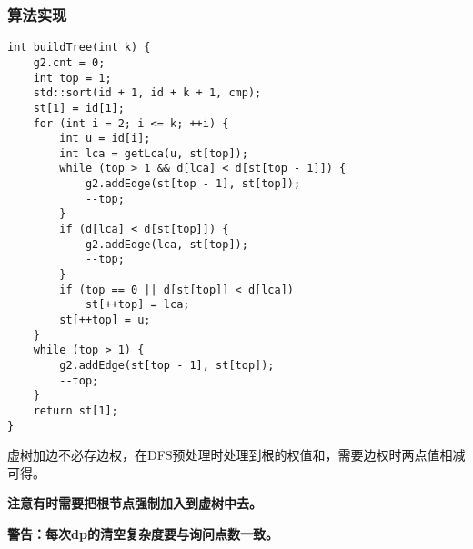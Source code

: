 \subsubsection{算法实现}

\begin{lstlisting}
int buildTree(int k) {
    g2.cnt = 0;
    int top = 1;
    std::sort(id + 1, id + k + 1, cmp);
    st[1] = id[1];
    for (int i = 2; i <= k; ++i) {
        int u = id[i];
        int lca = getLca(u, st[top]);
        while (top > 1 && d[lca] < d[st[top - 1]]) {
            g2.addEdge(st[top - 1], st[top]);
            --top;
        }
        if (d[lca] < d[st[top]]) {
            g2.addEdge(lca, st[top]);
            --top;
        }
        if (top == 0 || d[st[top]] < d[lca])
            st[++top] = lca;
        st[++top] = u;
    }
    while (top > 1) {
        g2.addEdge(st[top - 1], st[top]);
        --top;
    }
    return st[1];
}
\end{lstlisting}

虚树加边不必存边权，在DFS预处理时处理到根的权值和，需要边权时两点值相减可得。

{\bfseries 注意有时需要把根节点强制加入到虚树中去。}

{\bfseries 警告：每次dp的清空复杂度要与询问点数一致。}
